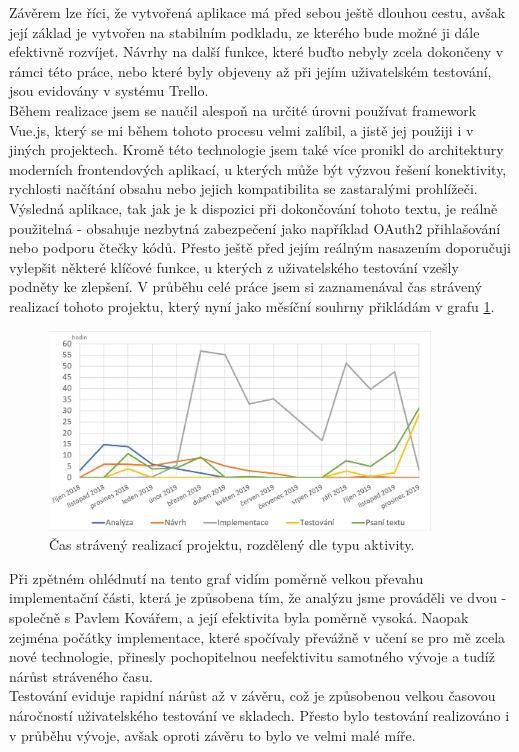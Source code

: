\begin{conclusion} \label{conclusion}

Závěrem lze říci, že vytvořená aplikace má před sebou ještě dlouhou cestu, avšak její základ je vytvořen na stabilním podkladu, ze kterého bude možné ji dále efektivně rozvíjet. Návrhy na další funkce, které buďto nebyly zcela dokončeny v rámci této práce, nebo které byly objeveny až při jejím uživatelském testování, jsou evidovány v systému Trello.\\
Během realizace jsem se naučil alespoň na určité úrovni používat framework Vue.js, který se mi během tohoto procesu velmi zalíbil, a jistě jej použiji i v jiných projektech. Kromě této technologie jsem také více pronikl do architektury moderních frontendových aplikací, u kterých může být výzvou řešení konektivity, rychlosti načítání obsahu nebo jejich kompatibilita se zastaralými prohlížeči.\\
Výsledná aplikace, tak jak je k dispozici při dokončování tohoto textu, je reálně použitelná - obsahuje nezbytná zabezpečení jako například OAuth2 přihlašování nebo podporu čtečky kódů. Přesto ještě před jejím reálným nasazením doporučuji vylepšit některé klíčové funkce, u kterých z uživatelského testování vzešly podněty ke zlepšení.
V průběhu celé práce jsem si zaznamenával čas strávený realizací tohoto projektu, který nyní jako měsíční souhrny přikládám v grafu \ref{picture:time:spent}.

\begin{figure}[H]
\includegraphics[width=0.9\textwidth]{../png/time/time_spent.png}
\caption[Měsíční čas strávený realizací projektu]{Čas strávený realizací projektu, rozdělený dle typu aktivity.} \label{picture:time:spent}
\end{figure}

Při zpětném ohlédnutí na tento graf vidím poměrně velkou převahu implementační části, která je způsobena tím, že analýzu jsme prováděli ve dvou - společně s Pavlem Kovářem, a její efektivita byla poměrně vysoká. Naopak zejména počátky implementace, které spočívaly převážně v učení se pro mě zcela nové technologie, přinesly pochopitelnou neefektivitu samotného vývoje a tudíž nárůst stráveného času.\\
Testování eviduje rapidní nárůst až v závěru, což je způsobenou velkou časovou náročností uživatelského testování ve skladech. Přesto bylo testování realizováno i v průběhu vývoje, avšak oproti závěru to bylo ve velmi malé míře.\\

\end{conclusion}
